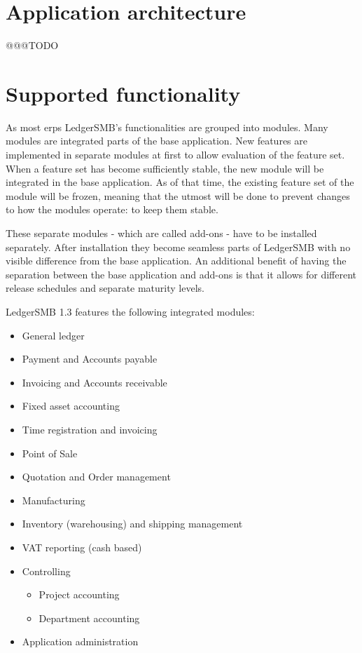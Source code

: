 \section{Application architecture}
\label{sec-ledgersmb-architecture}

@@@TODO

\section{Supported functionality}
\label{sec-ledgersmb-modules}
As most \glspl{erp} LedgerSMB's functionalities are grouped into modules.
Many modules are integrated parts of the base application.  New features
are implemented in separate modules at first to allow evaluation of the
feature set. When a feature set has become sufficiently stable, the new
module will be integrated in the base application. As of that time, the
existing feature set of the module will be frozen, meaning that the utmost
will be done to prevent changes to how the modules operate: to keep them
stable.

These separate modules - which are called \glspl{add-on} - have to be
installed separately. After installation they become seamless parts of
LedgerSMB with no visible difference from the base application. An
additional benefit of having the separation between the base application
and \glspl{add-on} is that it allows for different release schedules
and separate maturity levels.


LedgerSMB 1.3 features the following integrated modules:

\begin{itemize}
\item General ledger
\item Payment and Accounts payable
\item Invoicing and Accounts receivable
\item Fixed asset accounting
\item Time registration and invoicing
\item Point of Sale
\item Quotation and Order management
\item Manufacturing
\item Inventory (warehousing) and shipping management
\item VAT reporting (cash based)
\item Controlling
\begin{itemize}
\item Project accounting
\item Department accounting
\end{itemize}
\item Application administration
\end{itemize}

